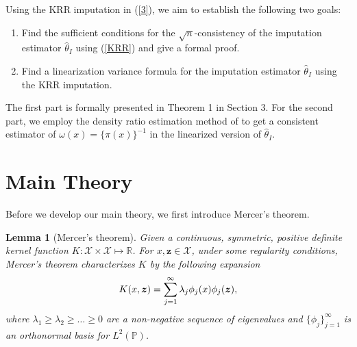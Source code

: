 \documentclass[12pt]{article}
\newtheorem{lemma}{Lemma}
\newcommand{\bx}{{x}}
\newcommand{\bz}{\bm{z}}
\def\wh{\widehat}
\begin{document}
Using the KRR imputation in (\ref{3}), we aim to establish the following two goals:
\begin{enumerate}
	\item Find the sufficient conditions for the   $\sqrt{n}$-consistency of the imputation estimator $\wh{\theta}_I$ using (\ref{KRR}) and give a formal proof. 
	\item Find a linearization variance formula for the imputation estimator $\wh{\theta}_I$ using the KRR imputation. 
\end{enumerate}
The first part is formally presented in Theorem 1 in Section 3. For the second part, we employ the density ratio estimation method of \cite{nguyen2010} 
to get a consistent estimator of  $\omega (\bx) = \{\pi (\bx)\}^{-1}$ in the linearized version of $\hat{\theta}_I$. 
\begin{comment}
By Theorem 1, we use the following estimator to estimate the variance of $\wh{\theta}_I$ in (\ref{2}): 
\begin{align}\label{variance estimation}
\wh{\mbox{V}} (\wh{\theta}_{I}) = \frac{1}{n(n-1)}\sum_{i=1}^{n}\left( \hat{\eta}_i - \bar{\eta} \right)^2 
\end{align}
where 
$$  \hat{\eta}_i =  \wh{m}(\bx_{i}) + \delta_{i} \wh{\omega}_{i} \left\{ y_{i} - \wh{m}(\bx_{i})\right\},
$$
and $ \wh{\omega}_{i} $ is a consistent estimator of $\omega (\bx) = \{\pi (\bx)\}^{-1}$. 
\end{comment} 



\section{Main Theory}


Before we develop our main theory, we first introduce Mercer's theorem. 
\begin{lemma}[Mercer's theorem]\label{Mercer}
Given a continuous, symmetric, positive definite kernel function $K: \mathcal{X} \times \mathcal{X} \mapsto \mathbb{R}$. For $\bx, \bz \in \mathcal{X}$, under some regularity conditions, Mercer's theorem characterizes $K$ by the following expansion
\begin{align}
 K(\bx, \bz) = \sum_{j=1}^{\infty}\lambda_{j}\phi_{j}(\bx) \phi_{j}(\bz),\notag
\end{align}
where $\lambda_{1} \geq \lambda_{2} \geq \ldots \geq 0$ are a non-negative sequence of eigenvalues and $\{\phi_{j} \}_{j=1}^{\infty}$ is an orthonormal basis for $L^{2}(\mathbb{P})$.
\end{lemma}
\end{document}
